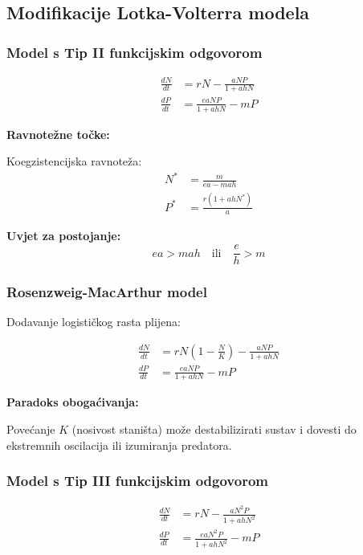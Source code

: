 \documentclass[11pt,oneside]{book}
\begin{document}
\subsection{Modifikacije Lotka-Volterra modela}

\subsubsection{Model s Tip II funkcijskim odgovorom}

\begin{align}
	\frac{dN}{dt} &= rN - \frac{aNP}{1 + ahN} \\
	\frac{dP}{dt} &= \frac{eaNP}{1 + ahN} - mP
\end{align}

\textbf{Ravnotežne točke:}

Koegzistencijska ravnoteža:
\begin{align}
	N^* &= \frac{m}{ea - mah} \\
	P^* &= \frac{r(1 + ahN^*)}{a}
\end{align}

\textbf{Uvjet za postojanje:}
\begin{equation}
	ea > mah \quad \text{ili} \quad \frac{e}{h} > m
\end{equation}

\subsubsection{Rosenzweig-MacArthur model}

Dodavanje logističkog rasta plijena:

\begin{align}
	\frac{dN}{dt} &= rN\left(1 - \frac{N}{K}\right) - \frac{aNP}{1 + ahN} \\
	\frac{dP}{dt} &= \frac{eaNP}{1 + ahN} - mP
\end{align}

\textbf{Paradoks obogaćivanja:}

Povećanje $K$ (nosivost staništa) može destabilizirati sustav i dovesti do ekstremnih oscilacija ili izumiranja predatora.

\subsubsection{Model s Tip III funkcijskim odgovorom}

\begin{align}
	\frac{dN}{dt} &= rN - \frac{aN^2P}{1 + ahN^2} \\
	\frac{dP}{dt} &= \frac{eaN^2P}{1 + ahN^2} - mP
\end{align}
\end{document}
